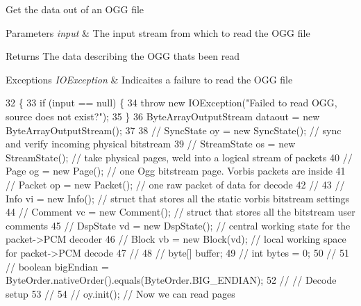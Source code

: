 Get the data out of an O\+GG file


\begin{DoxyParams}{Parameters}
{\em input} & The input stream from which to read the O\+GG file \\
\hline
\end{DoxyParams}
\begin{DoxyReturn}{Returns}
The data describing the O\+GG thats been read 
\end{DoxyReturn}

\begin{DoxyExceptions}{Exceptions}
{\em I\+O\+Exception} & Indicaites a failure to read the O\+GG file \\
\hline
\end{DoxyExceptions}

\begin{DoxyCode}
32                                                                  \{
33         \textcolor{keywordflow}{if} (input == null) \{
34             \textcolor{keywordflow}{throw} \textcolor{keyword}{new} IOException(\textcolor{stringliteral}{"Failed to read OGG, source does not exist?"});
35         \}
36         ByteArrayOutputStream dataout = \textcolor{keyword}{new} ByteArrayOutputStream();
37         
38 \textcolor{comment}{//      SyncState oy = new SyncState(); // sync and verify incoming physical bitstream}
39 \textcolor{comment}{//      StreamState os = new StreamState(); // take physical pages, weld into a logical stream of packets}
40 \textcolor{comment}{//      Page og = new Page(); // one Ogg bitstream page.  Vorbis packets are inside}
41 \textcolor{comment}{//      Packet op = new Packet(); // one raw packet of data for decode}
42 \textcolor{comment}{//}
43 \textcolor{comment}{//      Info vi = new Info(); // struct that stores all the static vorbis bitstream settings}
44 \textcolor{comment}{//      Comment vc = new Comment(); // struct that stores all the bitstream user comments}
45 \textcolor{comment}{//      DspState vd = new DspState(); // central working state for the packet->PCM decoder}
46 \textcolor{comment}{//      Block vb = new Block(vd); // local working space for packet->PCM decode}
47 \textcolor{comment}{//}
48 \textcolor{comment}{//      byte[] buffer;}
49 \textcolor{comment}{//      int bytes = 0;}
50 \textcolor{comment}{//}
51 \textcolor{comment}{//      boolean bigEndian = ByteOrder.nativeOrder().equals(ByteOrder.BIG\_ENDIAN);}
52 \textcolor{comment}{//      // Decode setup}
53 \textcolor{comment}{//}
54 \textcolor{comment}{//      oy.init(); // Now we can read pages}

\end{DoxyCode}
